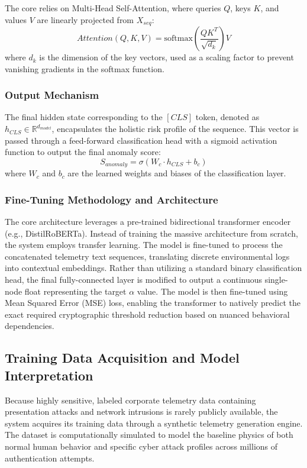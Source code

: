 \documentclass[pdflatex,sn-mathphys-num]{sn-jnl}
\theoremstyle{thmstyleone}%
\theoremstyle{thmstyletwo}%
\theoremstyle{thmstylethree}%
\begin{document}
The core relies on Multi-Head Self-Attention, where queries $Q$, keys $K$, and values $V$ are linearly projected from $X_{seq}$:
\begin{equation}
Attention(Q, K, V) = \text{softmax} \left( \frac{QK^T}{\sqrt{d_k}} \right) V \tag{27}
\end{equation}
where $d_k$ is the dimension of the key vectors, used as a scaling factor to prevent vanishing gradients in the softmax function.

\subsubsection{Output Mechanism}
The final hidden state corresponding to the $[CLS]$ token, denoted as $h_{CLS} \in \mathbb{R}^{d_{model}}$, encapsulates the holistic risk profile of the sequence. This vector is passed through a feed-forward classification head with a sigmoid activation function to output the final anomaly score:
\begin{equation}
S_{anomaly} = \sigma(W_c \cdot h_{CLS} + b_c) \tag{28}
\end{equation}
where $W_c$ and $b_c$ are the learned weights and biases of the classification layer.

\subsubsection{Fine-Tuning Methodology and Architecture}
The core architecture leverages a pre-trained bidirectional transformer encoder (e.g., DistilRoBERTa). Instead of training the massive architecture from scratch, the system employs transfer learning. The model is fine-tuned to process the concatenated telemetry text sequences, translating discrete environmental logs into contextual embeddings. Rather than utilizing a standard binary classification head, the final fully-connected layer is modified to output a continuous single-node float representing the target $\alpha$ value. The model is then fine-tuned using Mean Squared Error (MSE) loss, enabling the transformer to natively predict the exact required cryptographic threshold reduction based on nuanced behavioral dependencies.

\subsection{Training Data Acquisition and Model Interpretation}
Because highly sensitive, labeled corporate telemetry data containing presentation attacks and network intrusions is rarely publicly available, the system acquires its training data through a synthetic telemetry generation engine. The dataset is computationally simulated to model the baseline physics of both normal human behavior and specific cyber attack profiles across millions of authentication attempts.
\end{document}
